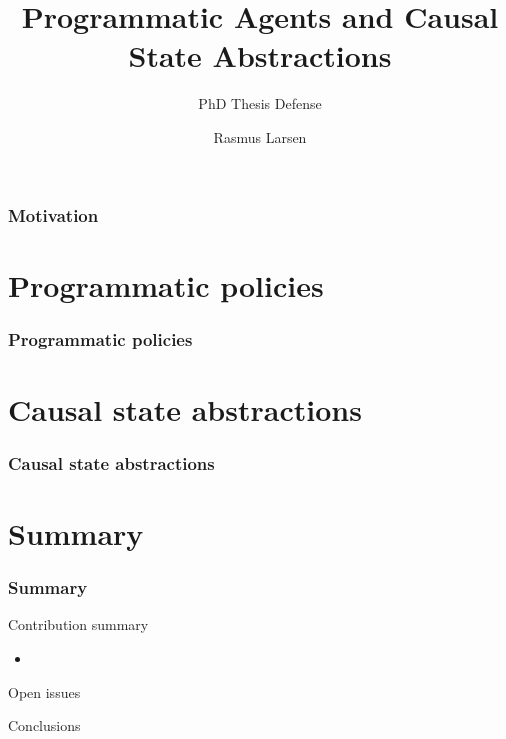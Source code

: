 \documentclass[aspectratio=169, hyperref={pdfpagelabels=false}]{beamer}
\subtitle{PhD Thesis Defense}
\title{Programmatic Agents and Causal State Abstractions}
\author{Rasmus Larsen}
\begin{document}
\inserttitlepage




\section{Motivation}


\part{Programmatic policies}
\frame[noframenumbering]{\centering\partpage\strut}
\section{Programmatic policies}


\part{Causal state abstractions}
\frame[noframenumbering]{\centering\partpage\strut}
\section{Causal state abstractions}


\part{Summary}
\frame[noframenumbering]{\centering\partpage\strut}
\section{Summary}
\begin{frame}{Contribution summary}
    \begin{itemize}
        \item 
    \end{itemize}
\end{frame}

\begin{frame}{Open issues}
    
\end{frame}

\begin{frame}{Conclusions}
    
\end{frame}
\end{document}
